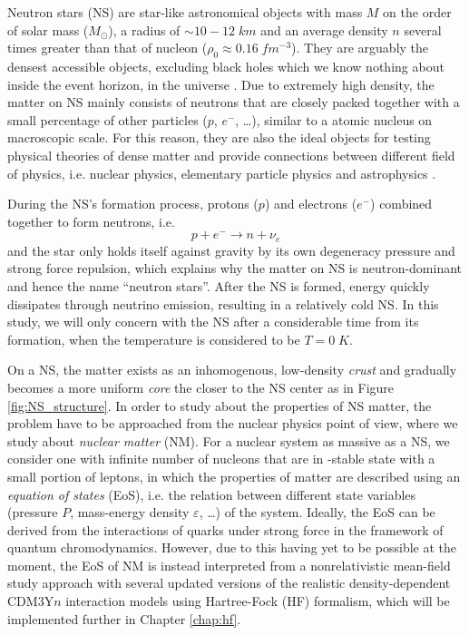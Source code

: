 
Neutron stars (\gls{NS}) are star-like astronomical objects with mass $M$ on the order of solar mass ($M_\odot$), a radius of $\sim 10-12\;km$ and an average density $n$ several times greater than that of nucleon ($\rho_0 \approx 0.16\;fm^{-3}$). They are arguably the densest accessible objects, excluding black holes which we know nothing about inside the event horizon, in the universe \citep{baym1975neutron}. Due to extremely high density, the matter on \gls{NS} mainly consists of neutrons that are closely packed together with a small percentage of other particles ($p$, $e^-$, \ldots), similar to a atomic nucleus on macroscopic scale. For this reason, they are also the ideal objects for testing physical theories of dense matter and provide connections between different field of physics, i.e. nuclear physics, elementary particle physics and astrophysics \citep{lattimer2004physics}.\par
During the \gls{NS}'s formation process, protons ($p$) and electrons ($e^-$) combined together to form neutrons, i.e.
\begin{equation}
        p + e^- \longrightarrow n + \nu_e
\end{equation}
and the star only holds itself against gravity by its own degeneracy pressure and strong force repulsion, which explains why the matter on \gls{NS} is neutron-dominant and hence the name ``neutron stars''. After the \gls{NS} is formed, energy quickly dissipates through neutrino emission, resulting in a relatively cold \gls{NS}. In this study, we will only concern with the \gls{NS} after a considerable time from its formation, when the temperature is considered to be $T=0\;K$.\par
On a \gls{NS}, the matter exists as an inhomogenous, low-density \emph{crust} and gradually becomes a more uniform \emph{core} the closer to the \gls{NS} center as in Figure \ref{fig:NS_structure}. In order to study about the properties of \gls{NS} matter, the problem have to be approached from the nuclear physics point of view, where we study about \emph{nuclear matter} (\gls{NM}). For a nuclear system as massive as a \gls{NS}, we consider one with infinite number of nucleons that are in \textbeta-stable state with a small portion of leptons, in which the properties of matter are described using an \emph{equation of states} (\gls{EoS}), i.e. the relation between different state variables (pressure $P$, mass-energy density $\varepsilon$, \ldots) of the system. Ideally, the \gls{EoS} can be derived from the interactions of quarks under strong force in the framework of quantum chromodynamics. However, due to this having yet to be possible at the moment, the \gls{EoS} of \gls{NM} is instead interpreted from a nonrelativistic mean-field study approach with several updated versions of the realistic density-dependent CDM3Y$n$ interaction models \citep{khoa1995equation,khoa2007mean} using Hartree-Fock (\gls{HF}) formalism, which will be implemented further in Chapter \ref{chap:hf}.

